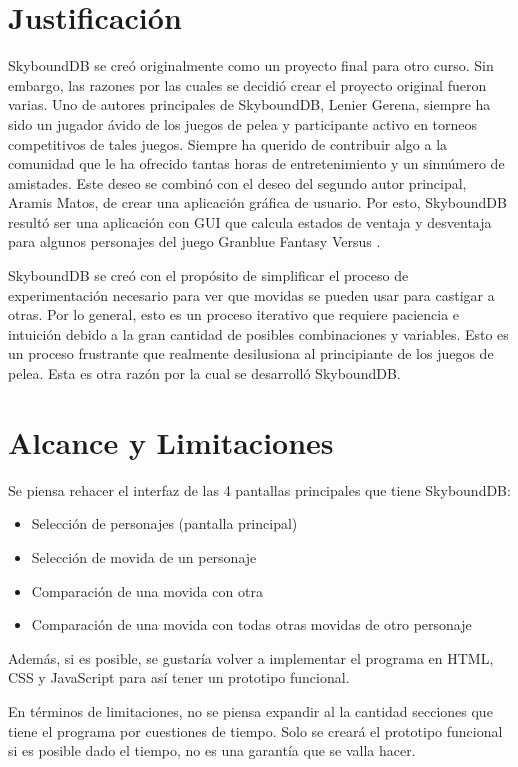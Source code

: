 \section{Justificación}
SkyboundDB se creó originalmente como un proyecto final para otro curso. Sin embargo, las razones por las cuales se decidió crear el proyecto original fueron varias. Uno de autores principales de SkyboundDB, Lenier Gerena, siempre ha sido un jugador ávido de los juegos de pelea y participante activo en torneos competitivos de tales juegos. Siempre ha querido de contribuir algo a la comunidad que le ha ofrecido tantas horas de entretenimiento y un sinnúmero de amistades. Este deseo se combinó con el deseo del segundo autor principal, Aramis Matos, de crear una aplicación gráfica de usuario. Por esto, SkyboundDB resultó ser una aplicación con GUI que calcula estados de ventaja y desventaja para algunos personajes del juego Granblue Fantasy Versus \cite{noauthor_granblue_2022}.

SkyboundDB
se creó con el propósito de simplificar el proceso de experimentación necesario para ver que movidas se pueden usar para castigar a otras. Por lo general, esto es un proceso iterativo que requiere paciencia e intuición debido a la gran cantidad de posibles combinaciones y variables. Esto es un proceso frustrante que realmente desilusiona al principiante de los juegos de pelea. Esta es otra razón por la cual se desarrolló SkyboundDB.

\section{Alcance y Limitaciones}

Se piensa rehacer el interfaz de las 4 pantallas principales que tiene SkyboundDB:
\begin{itemize}
    \item Selección de personajes (pantalla principal)
    \item Selección de movida de un personaje
    \item Comparación de una movida con otra
    \item Comparación de una movida con todas otras movidas de otro personaje
\end{itemize}

Además, si es posible, se gustaría volver a implementar el programa en HTML, CSS y JavaScript para así tener un prototipo funcional.

En términos de limitaciones, no se piensa expandir al la cantidad secciones que tiene el programa por cuestiones de tiempo. Solo se creará el prototipo funcional si es posible dado el tiempo, no es una garantía que se valla hacer.


